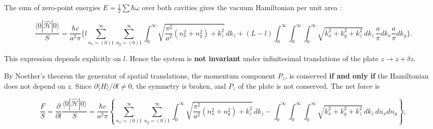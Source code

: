 \documentclass[twoside, 10pt]{article}
\def\myvspacebeforesubsection{-2.0mm}
\def\myvspaceaftersubsection{-2.5mm}
\begin{document}
\begin{multicols}{2}
\vspace{\myvspacebeforesubsection}
\subsection*{}
\vspace{\myvspaceaftersubsection}


The sum of zero-point energies \(E=\frac12\sum\hbar\omega\) over both cavities gives the vacuum
Hamiltonian per unit area \cite{Drozdov2024}:

\end{multicols}

\[
\frac{\langle 0|\hat{\mathcal{H}}|0\rangle}{S} = \frac{\hbar c}{a^2\pi} \Bigg\{
l \sum_{n_x=(0)1}^{\infty}\sum_{n_y=(0)1}^{\infty}
\int_0^{\infty} \sqrt{ \frac{\pi^2}{a^2}(n_x^2 + n_y^2) + k_z^2 } \, dk_z
+ (L - l) \int_0^{\infty}\!\!\int_0^{\infty}
\int_0^{\infty} \sqrt{k_x^2 + k_y^2 + k_z^2} \, dk_z \, \frac{a}{\pi}dk_x \frac{a}{\pi}dk_y
\Bigg\}.
\]

\begin{multicols}{2}

This expression depends explicitly on \(l\). Hence the system is \textbf{not invariant} under
infinitesimal translations of the plate \(z\to z+\delta z\).

By Noether's theorem the generator of spatial translations, the momentum component \(P_z\), is
conserved \textbf{if and only if} the Hamiltonian does not depend on \(z\). Since
\(\partial\langle H\rangle/\partial l\neq0\), the symmetry is broken, and \(P_z\) of the plate is not conserved. The net force is

\end{multicols}

\[
\frac{F}{S} = \frac{\partial}{\partial l} \frac{\langle 0|\hat{\mathcal{H}}|0\rangle}{S}
= \frac{\hbar c}{a^2\pi} \left\{
\sum_{n_x=(0)1}^{\infty}\sum_{n_y=(0)1}^{\infty}
\int_0^{\infty} \sqrt{ \frac{\pi^2}{a^2}(n_x^2 + n_y^2) + k_z^2 } \, dk_z
- \int_0^{\infty}\!\!\int_0^{\infty}
\int_0^{\infty} \sqrt{k_x^2 + k_y^2 + k_z^2} \, dk_z \, dn_x dn_y
\right\},
\]
\end{document}
